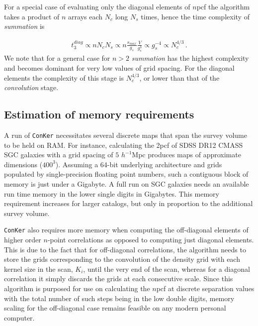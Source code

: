 \documentclass{aa}
\begin{document}
\begin{enumerate}
For a special case of evaluating only the diagonal elements of $n$pcf the algorithm takes a product of $n$ arrays each $N_c$ long $N_s$ times, hence the time complexity of \textit { summation} is

\begin{align}
t_3^{diag} \propto  n N_c N_s \propto n \frac{s_{max}}{g_s} \frac{V}{g_s^3}  \propto g_s^{-4} \propto N_c^{4/3} \, .
\label{eq:t3diag}
\end{align}
%
We note that for a general case for $n>2$\textit { summation} has the highest complexity and becomes dominant for very  low values of grid spacing. For the diagonal elements the complexity of this stage is $N_c^{4/3}$, or lower than that of the \textit { convolution} stage.

\end{enumerate}

\subsection{Estimation of memory requirements}
\label{app:memory}

A run of {\tt ConKer} necessitates several discrete maps that span the survey volume to be held on RAM. For instance, calculating the 2pcf of SDSS DR12 CMASS SGC galaxies with a grid spacing of $5$ $h^{-1}$Mpc produces maps of approximate dimensions ($400^3$). Assuming a 64-bit underlying architecture and grids populated by single-precision floating point numbers, such a contiguous block of memory is just under a Gigabyte. A full run on SGC galaxies needs an available run time memory in the lower single digits in Gigabytes. This memory requirement increases for larger catalogs, but only in proportion to the additional survey volume. 

{\tt ConKer} also requires more memory when computing the off-diagonal elements of higher order $n$-point correlations as opposed to computing just diagonal elements. This is due to the fact that for off-diagonal correlations, the algorithm needs to store the grids corresponding to the convolution of the density grid with each kernel size in the scan, $K_i$, until the very end of the scan, whereas for a diagonal correlation it simply discards the grids at each consecutive scale. Since this algorithm is purposed for use on calculating the $n$pcf at discrete separation values with the total number of such steps being in the low double digits, memory scaling for the off-diagonal case remains feasible on any modern personal computer.

\end{document}
